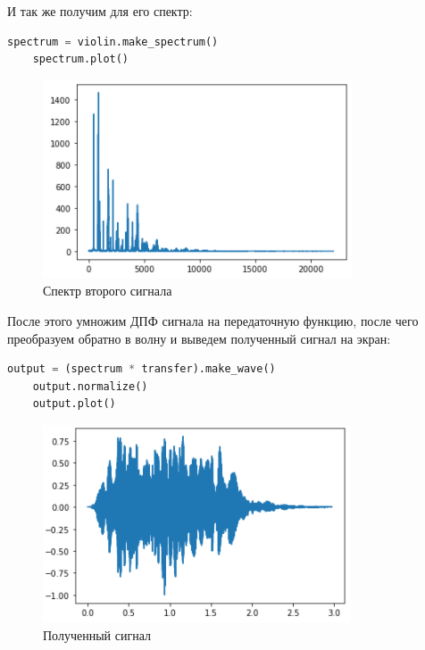 \documentclass[a4paper]{article}
\begin{document}
            И так же получим для его спектр:
            
\begin{lstlisting}[language=Python, caption= Получение спектра второго сигнала]
    spectrum = violin.make_spectrum()
    spectrum.plot()
\end{lstlisting}
            
            \begin{figure}[H]
                \centering
                \includegraphics{ex_1_4.png}
                \caption{Спектр второго сигнала}
                \label{fig:ex_1_4}
            \end{figure}
            
            После этого умножим ДПФ сигнала на передаточную функцию, после чего преобразуем обратно в волну и выведем полученный сигнал на экран:
            
\begin{lstlisting}[language=Python, caption= Преобразование сигнала]
    output = (spectrum * transfer).make_wave()
    output.normalize()
    output.plot()
\end{lstlisting}
            
            \begin{figure}[H]
                \centering
                \includegraphics{ex_1_5.png}
                \caption{Полученный сигнал}
                \label{fig:ex_1_5}
            \end{figure}
            
\end{document}
